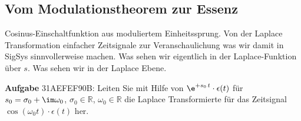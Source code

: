 



\clearpage
\subsection{Vom Modulationstheorem zur Essenz}
\label{sec:31AEFEF90B}
\begin{Ziel}
Cosinus-Einschaltfunktion aus moduliertem Einheitssprung. Von der
Laplace Transformation einfacher Zeitsignale zur Veranschaulichung was wir damit
in SigSys sinnvollerweise machen. Was sehen wir eigentlich in der Laplace-Funktion
über $s$. Was sehen wir in der Laplace Ebene.
\end{Ziel}
\textbf{Aufgabe} {\tiny 31AEFEF90B}: Leiten Sie mit Hilfe von
$\e^{+s_0 \, t} \cdot \epsilon(t)$ für
$s_0=\sigma_0 + \im \omega_0$,
$\sigma_0\in\mathbb{R}$,
$\omega_0\in\mathbb{R}$
die Laplace Transformierte
für das Zeitsignal $\cos(\omega_0 t) \cdot \epsilon(t)$ her.

